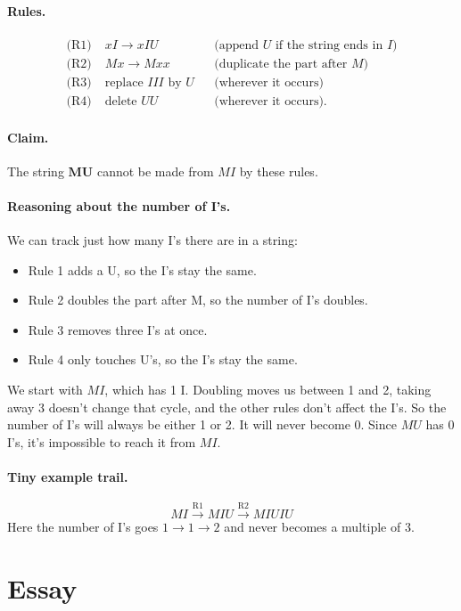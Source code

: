 \documentclass{article}
\theoremstyle{theorem}
\theoremstyle{definition}
\theoremstyle{remark}
\begin{document}
\paragraph{Rules.}
\begin{align*}
\text{(R1)}\;& xI \rightarrow xIU && \text{(append $U$ if the string ends in $I$)}\\
\text{(R2)}\;& Mx \rightarrow Mxx && \text{(duplicate the part after $M$)}\\
\text{(R3)}\;& \text{replace }III\text{ by }U && \text{(wherever it occurs)}\\
\text{(R4)}\;& \text{delete }UU && \text{(wherever it occurs).}
\end{align*}

\paragraph{Claim.} The string $\mathbf{MU}$ cannot be made from $MI$ by these rules.

\paragraph{Reasoning about the number of I's.}
We can track just how many I’s there are in a string:

\begin{itemize}
  \item Rule 1 adds a U, so the I’s stay the same.
  \item Rule 2 doubles the part after M, so the number of I’s doubles.
  \item Rule 3 removes three I’s at once.
  \item Rule 4 only touches U’s, so the I’s stay the same.
\end{itemize}

We start with $MI$, which has 1 I. Doubling moves us between 1 and 2, taking away 3 doesn’t change that cycle, and the other rules don’t affect the I’s. So the number of I’s will always be either 1 or 2. It will never become 0. Since $MU$ has 0 I’s, it’s impossible to reach it from $MI$.

\paragraph{Tiny example trail.}
\[
MI \xrightarrow{\text{R1}} MIU \xrightarrow{\text{R2}} MIUIU
\]
Here the number of I’s goes $1 \to 1 \to 2$ and never becomes a multiple of $3$.

\section{Essay}
\end{document}

